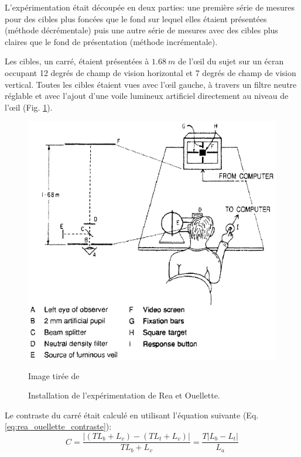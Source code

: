	\par L'expérimentation était découpée en deux parties: une première série de mesures pour des cibles plus foncées que le fond sur lequel elles étaient présentées (méthode décrémentale) puis une autre série de mesures avec des cibles plus claires que le fond de présentation (méthode incrémentale).
	
	\par Les cibles, un carré, étaient présentées à $1.68~m$ de l'œil du sujet sur un écran occupant 12 degrés de champ de vision horizontal et 7 degrés de champ de vision vertical. Toutes les cibles étaient vues avec l'œil gauche, à travers un filtre neutre réglable et avec l'ajout d'une voile lumineux artificiel directement au niveau de l'œil (Fig. \ref{fig:rea_apparatus}).
	
	\begin{figure}
		\centering
		\includegraphics[scale=.75]{Figures/ReactionTimeApparatus}
		\caption{Installation de l'expérimentation de Rea et Ouellette.}{Image tirée de \citep{rea_visual_1988}}
		\label{fig:rea_apparatus}
	\end{figure}
	
	\par Le contraste du carré était calculé en utilisant l'équation suivante (Eq. \ref{eq:rea_ouellette_contraste}):
	 \begin{equation}
		C = \frac{\vert (T L_b + L_v) - (T L_t + L_v) \vert}{T L_b + L_v} = \frac{T \vert L_b - L_t \vert}{L_a}
		\label{eq:rea_ouellette_contraste}
	\end{equation}
	
